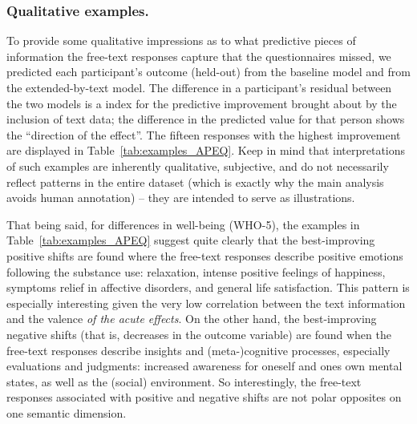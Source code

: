 \documentclass[man,floatsintext]{apa7}
\newcommand{\change}[1]{#1}
\begin{document}
\subsubsection{Qualitative examples.} To provide some qualitative impressions as to what predictive pieces of information the free-text responses capture that the questionnaires missed, we predicted each participant's outcome (\change{held-out}) from the baseline model and from the extended-by-text model. The difference in a participant's residual between the two models is a index for the predictive improvement brought about by the inclusion of text data; the difference in the predicted value for that person shows the ``direction of the effect''. The fifteen responses with the highest improvement are displayed in Table~\ref{tab:examples_APEQ}. Keep in mind that interpretations of such examples are inherently qualitative, subjective, and do not necessarily reflect patterns in the entire dataset (which is exactly why the main analysis avoids human annotation) -- they are intended to serve as illustrations. 

That being said, for differences in well-being (WHO-5), the examples in Table~\ref{tab:examples_APEQ} suggest quite clearly that the best-improving positive shifts are found where the free-text responses describe positive emotions following the substance use: relaxation, intense positive feelings of happiness, symptoms relief in affective disorders,  and general life satisfaction. This pattern is especially interesting given the very low correlation between the text information and the valence \emph{of the acute effects}. On the other hand, the best-improving negative shifts (that is, decreases in the outcome variable)  are found when the free-text responses describe insights and (meta-)cognitive processes, especially evaluations and judgments: increased awareness for oneself and ones own mental states, as well as the (social) environment. So interestingly, the free-text responses associated with positive and negative shifts are not polar opposites on one semantic dimension. 
\end{document}

